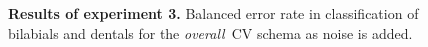 \documentclass[10pt]{article}
\newcommand{\overall}{\emph{overall}}
\begin{document}
\begin{figure}[ht]
\begin{center}
\end{center} 
\caption{{\bf Results of experiment 3.} Balanced error rate in classification of bilabials and dentals for the
\overall\ CV schema as noise is added.}
\label{fig:class3_perf}
\end{figure}


\end{document}
